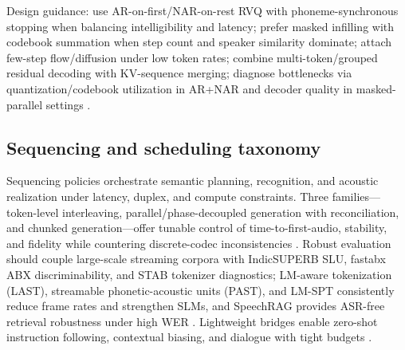 \documentclass{article}
\begin{document}
Design guidance: use AR-on-first/NAR-on-rest RVQ with phoneme-synchronous stopping when balancing intelligibility and latency; prefer masked infilling with codebook summation when step count and speaker similarity dominate; attach few-step flow/diffusion under low token rates; combine multi-token/grouped residual decoding with KV-sequence merging; diagnose bottlenecks via quantization/codebook utilization in AR+NAR and decoder quality in masked-parallel settings \cite{li2024masksrmaskedlanguagemodelfullbandspeechr,li2024investigatingneuralaudiocodecsspeechlang,wang2025tadicodectextawarediffusionspeechtokeniz}.

\subsection{Sequencing and scheduling taxonomy} \label{subsec:sequencingandschedulingtaxonomy}
Sequencing policies orchestrate semantic planning, recognition, and acoustic realization under latency, duplex, and compute constraints. Three families---token-level interleaving, parallel/phase-decoupled generation with reconciliation, and chunked generation---offer tunable control of time-to-first-audio, stability, and fidelity while countering discrete-codec inconsistencies \cite{liu2024analyzingmitigatinginconsistencydiscrete}. Robust evaluation should couple large-scale streaming corpora with IndicSUPERB SLU, fastabx ABX discriminability, and STAB tokenizer diagnostics; LM-aware tokenization (LAST), streamable phonetic-acoustic units (PAST), and LM-SPT consistently reduce frame rates and strengthen SLMs, and SpeechRAG provides ASR-free retrieval robustness under high WER \cite{turetzky2024lastlanguagemodelawarespeechtokenization,har-tuv2025pastphoneticacousticspeechtokenizer,jo2025lmsptalignedsemanticdistillationspeechto,poli2025fastabxlibraryefficientcomputationabxdis,vashishth2024stabspeechtokenizerassessmentbenchmark,min2025speechretrievalaugmentedgenerationwithou,entry2025indicsuperbspeechprocessinguniversalperf}. Lightweight bridges enable zero-shot instruction following, contextual biasing, and dialogue with tight budgets \cite{wang2023slmbridgethingapbetweenspeechtextfoundat}.
\end{document}
